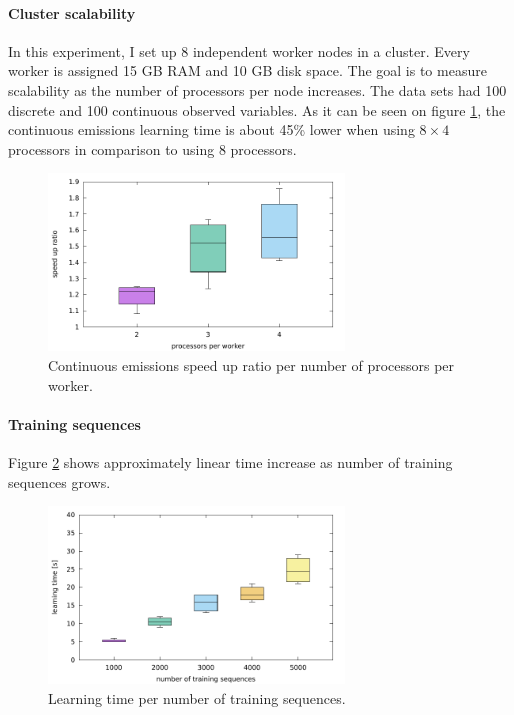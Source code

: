 \documentclass[thesis=B,english]{FITthesis}[2012/06/26]
\begin{document}
\paragraph{Cluster scalability}

In this experiment, I set up 8 independent worker nodes in a cluster. Every worker is assigned 15 GB RAM and 10 GB disk space. The goal is to measure scalability as the number of processors per node increases. The data sets had 100 discrete and 100 continuous observed variables. As it can be seen on figure \ref{fig:cluster_continuous_learning_time}, the continuous emissions learning time is about 45\% lower when using $8 \times 4$ processors in comparison to using 8 processors.

\begin{figure}
	\centering
 	\includegraphics[width=0.7\textwidth]{cluster_continuous_learning_time}
 	\caption{Continuous emissions speed up ratio per number of processors per worker.}
 	\label{fig:cluster_continuous_learning_time}
\end{figure}

\paragraph{Training sequences}

Figure \ref{fig:learning_set_learning_time} shows approximately linear time increase as number of training sequences grows.

\begin{figure}
	\centering
 	\includegraphics[width=0.7\textwidth]{learning_set_learning_time}
 	\caption{Learning time per number of training sequences.}
 	\label{fig:learning_set_learning_time}
\end{figure}
\end{document}

